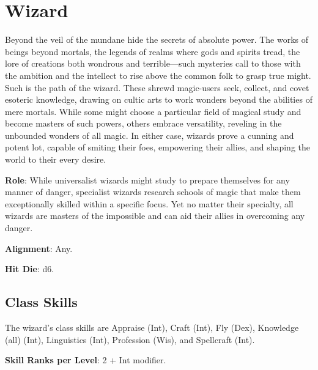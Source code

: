 \section{Wizard}

\label{f0}				
Beyond the veil of the mundane hide the secrets of absolute power. The works of beings beyond mortals, the legends of realms where gods and spirits tread, the lore of creations both wondrous and terrible---such mysteries call to those with the ambition and the intellect to rise above the common folk to grasp true might. Such is the path of the wizard. These shrewd magic-users seek, collect, and covet esoteric knowledge, drawing on cultic arts to work wonders beyond the abilities of mere mortals. While some might choose a particular field of magical study and become masters of such powers, others embrace versatility, reveling in the unbounded wonders of all magic. In either case, wizards prove a cunning and potent lot, capable of smiting their foes, empowering their allies, and shaping the world to their every desire.
				
\textbf{Role}: While universalist wizards might study to prepare themselves for any manner of danger, specialist wizards research schools of magic that make them exceptionally skilled within a specific focus. Yet no matter their specialty, all wizards are masters of the impossible and can aid their allies in overcoming any danger.
				
\textbf{Alignment}: Any.
				
\textbf{Hit Die}: d6.
				
\subsection{Class Skills}

				
The wizard's class skills are Appraise (Int), Craft (Int), Fly (Dex), Knowledge (all) (Int), Linguistics (Int), Profession (Wis), and Spellcraft (Int). 
				
\textbf{Skill Ranks per Level}: 2 + Int modifier.

